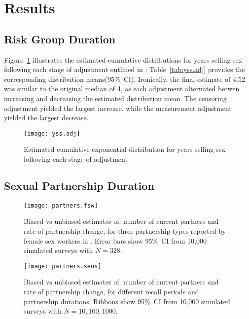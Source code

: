 \section{Results}
\subsection{Risk Group Duration}\label{res.yss}
Figure~\ref{fig:yss.adj} illustrates
the estimated cumulative distributions for years selling sex
following each stage of adjustment outlined in ;
Table~\ref{tab:yss.adj} provides the corresponding distribution means(95\%~CI).
Ironically, the final estimate of 4.52 was similar to the original median of 4,
as each adjustment alternated betwen increasing and decreasing
the estimated distribution mean.
The censoring adjustment yielded the largest increase, while
the measurement adjustment yielded the largest decrease.
\begin{figure}
  \centering\texttt{[image: yss.adj]}
  \caption{Estimated cumulative exponential distribution for years selling sex
    following each stage of adjustment}
  \label{fig:yss.adj}
\end{figure}
\subsection{Sexual Partnership Duration}\label{res.partners}
\begin{figure}[h]
  \centering\texttt{[image: partners.fsw]}
  \caption{Biased vs unbiased estimates of:
    number of current partners and rate of partnership change,
    for three partnership types reported by female sex workers in \cite{Baral2014}.
    Error bars show 95\%~CI from 10,000 simulated surveys with $N = 328$.}
  \label{fig:partners.fsw}
\end{figure}
\begin{figure}[h]
  \centering\texttt{[image: partners.sens]}
  \caption{Biased vs unbiased estimates of:
    number of current partners and rate of partnership change,
    for different recall periods and partnership durations.
    Ribbons show 95\%~CI from 10,000 simulated surveys with $N = 10, 100, 1000$.}
  \label{fig:partners.sens}
\end{figure}
